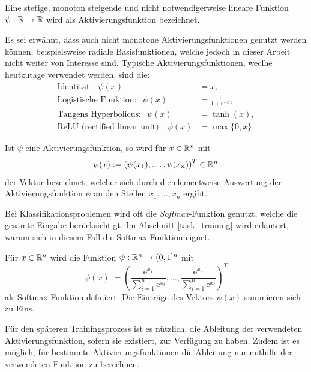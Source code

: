 \begin{defi}[Aktivierungsfunktion]
    \label{def_act_f}
    Eine stetige, monoton steigende und nicht notwendigerweise lineare Funktion $\psi: \mathbb{R} \rightarrow \mathbb{R}$ wird als Aktivierungsfunktion bezeichnet.
\end{defi}
Es sei erwähnt, dass auch nicht monotone Aktivierungsfunktionen genutzt werden können, beispielsweise radiale Basisfunktionen\cite{radialbasis}, welche jedoch in dieser Arbeit nicht weiter von Interesse sind.
Typische Aktivierungsfunktionen, weclhe heutzutage verwendet werden, sind die:
\begin{align*}
    \text{Identität}: \; \;\psi(x)&=x, \\
    \text{Logistische Funktion}: \; \;\psi(x)&=\frac{1}{1+\mathrm{e}^{-x}}, \\
    \text{Tangens Hyperbolicus}: \; \;\psi(x)&=\tanh(x), \\
    \text{ReLU (rectified linear unit)}: \; \;\psi(x)&=\max\{0,x\}.
\end{align*}

\begin{bem}
    Ist $\psi$ eine Aktivierungsfunktion, so wird für $x \in \mathbb{R}^n$ mit 
    \[\psi(x):=\left(\psi(x_1), \ldots, \psi(x_n)\right)^T \in \mathbb{R}^n
    \]
    der Vektor bezeichnet, welcher sich durch die elementweise Auswertung der Aktivierungsfunktion $\psi$ an den Stellen $x_1, \ldots, x_n$ ergibt. 
\end{bem}

Bei Klassifikationsproblemen wird oft die \textit{Softmax}-Funktion\cite{denker1990transforming} genutzt, welche die gesamte Eingabe berücksichtigt. Im Abschnitt \ref{task_training} wird erläutert, warum sich in diesem Fall die Softmax-Funktion eignet.

\begin{defi}
    Für $x \in \mathbb{R}^n$ wird die Funktion $\psi: \mathbb{R}^n \rightarrow (0,1]^n$ mit 
    \[
        \psi(x):=\left(\frac{\mathrm{e}^{x_1}}{\sum_{i=1}^n \mathrm{e}^{x_i}}, \ldots,\frac{\mathrm{e}^{x_n}}{\sum_{i=1}^n \mathrm{e}^{x_i}} \right)^T
    \]
    als Softmax-Funktion definiert. Die Einträge des Vektors $\psi(x)$ summieren sich zu Eins.  
\end{defi}

Für den späteren Trainingsprozess ist es nützlich, die Ableitung der verwendeten Aktivierungsfunktion, sofern sie existiert, zur Verfügung zu haben. Zudem ist es möglich, für bestimmte Aktivierungsfunktionen die Ableitung nur mithilfe der verwendeten Funktion zu berechnen.

